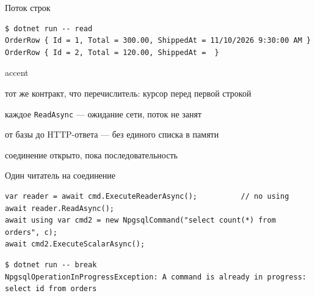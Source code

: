 \documentclass[aspectratio=169,10pt,t]{beamer}
\newcommand{\codesm}{\ttfamily\fontsize{7.6}{9.0}\selectfont}
\newcommand{\termsm}{\ttfamily\fontsize{6.6}{7.9}\selectfont}
\begin{document}
\begin{frame}[fragile]{Поток строк}
  \slidetop

\begin{lstlisting}[style=term,basicstyle=\termsm]
$ dotnet run -- read
OrderRow { Id = 1, Total = 300.00, ShippedAt = 11/10/2026 9:30:00 AM }
OrderRow { Id = 2, Total = 120.00, ShippedAt =  }
\end{lstlisting}

  \slidegap
  \begin{cbul}{accent}
    \item тот же контракт, что перечислитель: курсор перед первой строкой
    \item каждое \texttt{ReadAsync} --- ожидание сети, поток не занят
    \item от базы до HTTP-ответа --- без единого списка в памяти
    \item соединение открыто, пока последовательность 
  \end{cbul}
\end{frame}

\begin{frame}[plain]
\end{frame}

\begin{frame}[fragile]{Один читатель на соединение}
  \slidetop

\begin{lstlisting}[style=csharp,basicstyle=\codesm]
var reader = await cmd.ExecuteReaderAsync();          // no using
await reader.ReadAsync();
await using var cmd2 = new NpgsqlCommand("select count(*) from orders", c);
await cmd2.ExecuteScalarAsync();
\end{lstlisting}

\begin{lstlisting}[style=term,basicstyle=\termsm]
$ dotnet run -- break
NpgsqlOperationInProgressException: A command is already in progress: select id from orders
\end{lstlisting}

\end{frame}
\end{document}
